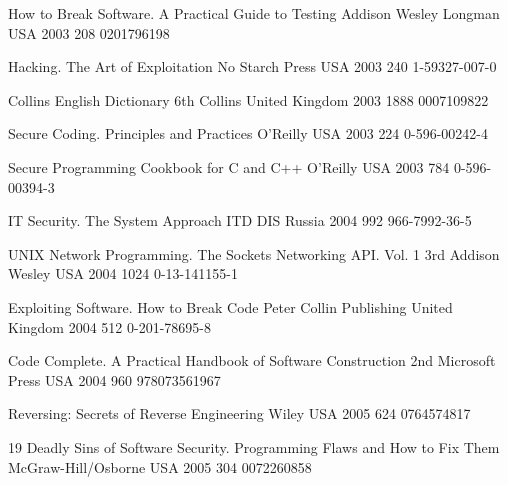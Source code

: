 \begin{thebibliography}{9}
		{}
		{How to Break Software. A Practical Guide to Testing}
		{}
		{Addison Wesley Longman}
		{USA}
		{2003}
		{208}
		{0201796198}
	
		{}
		{Hacking. The Art of Exploitation}
		{}
		{No Starch Press}
		{USA}
		{2003}
		{240}
		{1-59327-007-0}
	
		{}
		{Collins {E}nglish {D}ictionary}
		{6th}
		{Collins}
		{United Kingdom}
		{2003}
		{1888}
		{0007109822}
	
		{
			\BibAnd
			}
		{Secure Coding. Principles and Practices}
		{}
		{O'Reilly}
		{USA}
		{2003}
		{224}
		{0-596-00242-4}
	
		{
			\BibAnd
			}
		{Secure Programming Cookbook for {C} and {C++}}
		{}
		{O'Reilly}
		{USA}
		{2003}
		{784}
		{0-596-00394-3}
	
		{}
		{{IT} Security. The System Approach}
		{}
		{ITD DIS}
		{Russia}
		{2004}
		{992}
		{966-7992-36-5}
	
		{
			\BibAnd
			\BibAnd
			}
		{{UNIX} Network Programming. The Sockets Networking {API}. Vol. 1}
		{3rd}
		{Addison Wesley}
		{USA}
		{2004}
		{1024}
		{0-13-141155-1}
	
		{
			\BibAnd
			}
		{Exploiting Software. How to Break Code}
		{}
		{Peter Collin Publishing}
		{United Kingdom}
		{2004}
		{512}
		{0-201-78695-8}
	
		{}
		{Code Complete. A Practical Handbook of Software Construction}
		{2nd}
		{Microsoft Press}
		{USA}
		{2004}
		{960}
		{978073561967}
	
		{}
		{Reversing: Secrets of Reverse Engineering}
		{}
		{Wiley}
		{USA}
		{2005}
		{624}
		{0764574817}
	
		{
			\BibAnd
			\BibAnd
			}
		{19 Deadly Sins of Software Security. Programming Flaws and How to Fix Them}
		{}
		{McGraw-Hill/Osborne}
		{USA}
		{2005}
		{304}
		{0072260858}
	

\end{thebibliography}
